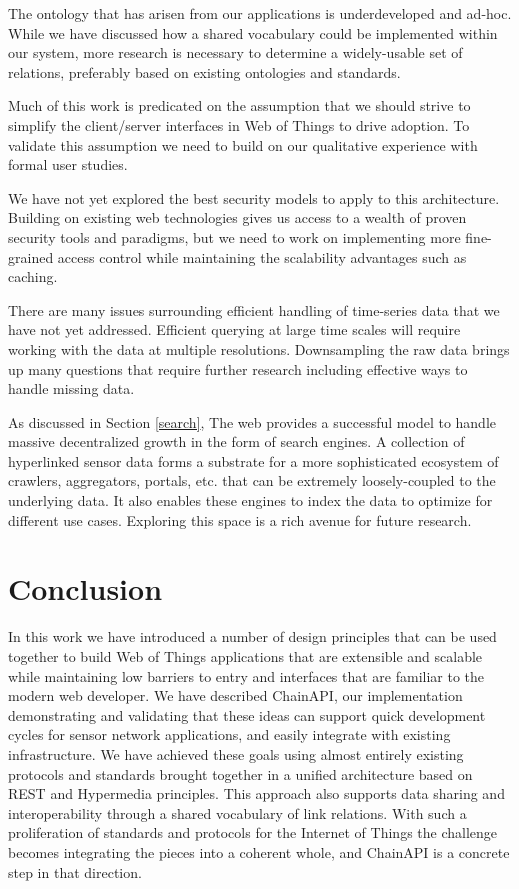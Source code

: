 \documentclass{acm_proc_article-sp}
\begin{document}
The ontology that has arisen from our applications is underdeveloped and
ad-hoc. While we have discussed how a shared vocabulary could be implemented
within our system, more research is necessary to determine a widely-usable set
of relations, preferably based on existing ontologies and standards.

Much of this work is predicated on the assumption that we should strive to
simplify the client/server interfaces in Web of Things to drive adoption. To
validate this assumption we need to build on our qualitative experience with
formal user studies.

We have not yet explored the best security models to apply to this
architecture. Building on existing web technologies gives us access to a wealth
of proven security tools and paradigms, but we need to work on implementing
more fine-grained access control while maintaining the scalability advantages
such as caching.

There are many issues surrounding efficient handling of time-series data that
we have not yet addressed. Efficient querying at large time scales will require
working with the data at multiple resolutions. Downsampling the raw data brings
up many questions that require further research including effective ways to
handle missing data.

As discussed in Section \ref{search}, The web provides a successful model to
handle massive decentralized growth in the form of search engines. A collection
of hyperlinked sensor data forms a substrate for a more sophisticated ecosystem
of crawlers, aggregators, portals, etc. that can be extremely loosely-coupled
to the underlying data. It also enables these engines to index the data to
optimize for different use cases. Exploring this space is a rich avenue for
future research.

\section{Conclusion}
In this work we have introduced a number of design principles that can be used
together to build Web of Things applications that are extensible and scalable
while maintaining low barriers to entry and interfaces that are familiar to the
modern web developer. We have described ChainAPI, our implementation
demonstrating and validating that these ideas can support quick development
cycles for sensor network applications, and easily integrate with existing
infrastructure. We have achieved these goals using almost entirely existing
protocols and standards brought together in a unified architecture based on
REST and Hypermedia principles. This approach also supports data sharing and
interoperability through a shared vocabulary of link relations. With such a
proliferation of standards and protocols for the Internet of Things the
challenge becomes integrating the pieces into a coherent whole, and ChainAPI
is a concrete step in that direction.
\end{document}
